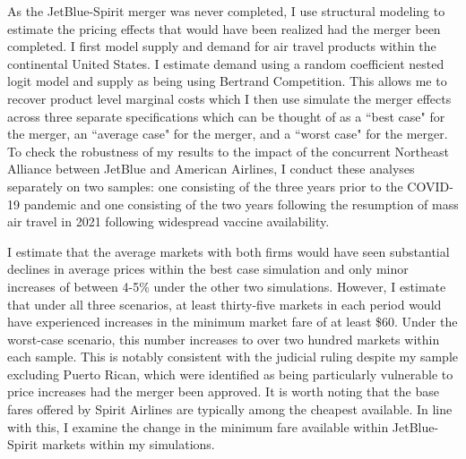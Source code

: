 \documentclass{article}
\begin{document}

    As the JetBlue-Spirit merger was never completed, I  use structural modeling to estimate the pricing effects that would have been realized had the merger been completed. I first model supply and demand for air travel products within the continental United States. I estimate demand using a random coefficient nested logit model and supply as being using Bertrand Competition. This allows me to recover product level marginal costs which I then use simulate the merger effects across three separate specifications which can be thought of as a ``best case" for the merger, an ``average case" for the merger, and a ``worst case" for the merger. To check the robustness of my results to the impact of the concurrent Northeast Alliance between JetBlue and American Airlines, I conduct these analyses separately on two samples: one consisting of the three years prior to the COVID-19 pandemic and one consisting of the two years following the resumption of mass air travel in 2021 following widespread vaccine availability. 

    I estimate that the average markets with both firms would have seen substantial declines in average prices within the best case simulation and only minor increases of between 4-5\% under the other two simulations. However, I estimate that under all three scenarios, at least thirty-five markets in each period would have experienced increases in the minimum market fare of at least \$60. Under the worst-case scenario, this number increases to over two hundred markets within each sample. This is notably consistent with the judicial ruling despite my sample excluding Puerto Rican, which were identified as being particularly vulnerable to price increases had the merger been approved. It is worth noting that the base fares offered by Spirit Airlines are typically among the cheapest available. In line with this, I examine the change in the minimum fare available within JetBlue-Spirit markets within my simulations.

\end{document}
